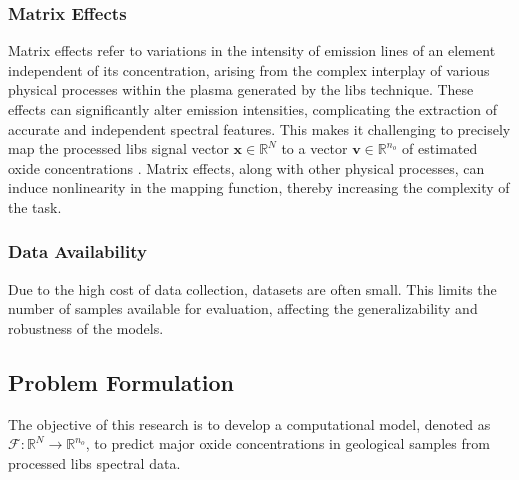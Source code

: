 \subsubsection{Matrix Effects}
Matrix effects refer to variations in the intensity of emission lines of an element independent of its concentration, arising from the complex interplay of various physical processes within the plasma generated by the \gls{libs} technique. These effects can significantly alter emission intensities, complicating the extraction of accurate and independent spectral features. This makes it challenging to precisely map the processed \gls{libs} signal vector $\mathbf{x} \in \mathbb{R}^N$ to a vector $\mathbf{v} \in \mathbb{R}^{n_o}$ of estimated oxide concentrations \cite{cleggRecalibrationMarsScience2017, andersonImprovedAccuracyQuantitative2017}.
Matrix effects, along with other physical processes, can induce nonlinearity in the mapping function, thereby increasing the complexity of the task\cite{liuRecentAdvancesMachine2024}.

\subsubsection{Data Availability}
Due to the high cost of data collection, datasets are often small. This limits the number of samples available for evaluation, affecting the generalizability and robustness of the models\cite{p9_paper}.

\subsection{Problem Formulation}
The objective of this research is to develop a computational model, denoted as $\mathcal{F}: \mathbb{R}^N \rightarrow \mathbb{R}^{n_o}$, to predict major oxide concentrations in geological samples from processed \gls{libs} spectral data. 
